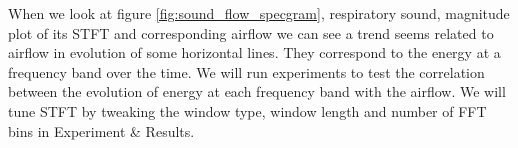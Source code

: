 When we look at figure \ref{fig:sound_flow_specgram}, respiratory sound, magnitude plot of its STFT and corresponding airflow we can see a trend seems related to airflow in evolution of some horizontal lines. They correspond to the energy at a frequency band over the time. We will run experiments to test the correlation between the evolution of energy at each frequency band with the airflow. We will tune STFT by tweaking the window type, window length and number of FFT bins in Experiment \& Results. 

